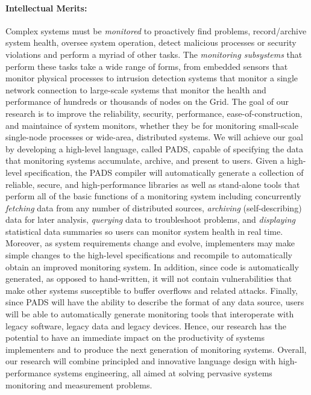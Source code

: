 
\paragraph*{Intellectual Merits:} 
Complex systems must be {\em monitored} to proactively find problems,
record/archive system health, oversee system operation, detect
malicious processes or security violations and perform a myriad of other tasks.
The {\em monitoring subsystems} 
that perform these tasks take a wide range of forms, 
from embedded sensors that monitor physical processes to
intrusion detection systems that monitor a single network connection
to large-scale systems
that monitor the health and performance of hundreds or thousands of nodes
on the Grid.  
The goal of our research is to improve the reliability, security,
performance, ease-of-construction, and maintaince of system monitors, 
whether they
be for monitoring small-scale single-node processes or wide-area, 
distributed systems.  We will achieve our goal by developing a 
high-level language, called PADS, capable of specifying
the data that monitoring systems accumulate, 
archive, and present to users.  Given a high-level specification,
the PADS compiler will automatically generate a collection of
reliable, secure, and high-performance libraries as well as stand-alone
tools that perform all of the basic functions of a monitoring system
including concurrently {\em fetching} data from any number of distributed
sources, {\em archiving} (self-describing) data for later analysis,
{\em querying} data to troubleshoot problems, and {\em displaying}
statistical data summaries so users can monitor system health in real time.
Moreover, as system requirements change and evolve, implementers may make
simple changes to the high-level specifications and recompile to 
automatically obtain an improved monitoring system.  In addition,
since code is automatically generated, as opposed to hand-written, 
it will not contain vulnerabilities
that make other systems susceptible to buffer overflows and related attacks.  
Finally, since
PADS will have the ability to describe the format of 
any data source, users will be able
to automatically generate monitoring tools that interoperate with
legacy software, legacy data and legacy devices.  
Hence, our
research has the potential to have an immediate impact on the productivity of
systems implementers and to produce the next generation of monitoring systems.
Overall, our research will combine principled and innovative language design 
with high-performance systems engineering, all aimed at solving
pervasive systems monitoring and measurement problems.

